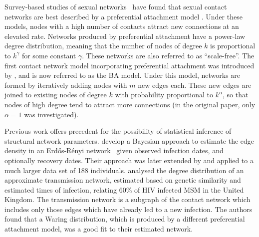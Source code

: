 \documentclass[12pt]{article}\usepackage[]{graphicx}\usepackage[]{color}
\begin{document}
Survey-based studies of sexual networks~\autocite{liljeros2001web,
schneeberger2004scale} have found that sexual contact networks are best
described by a preferential attachment model \autocite[although there has been
some disagreement, see][]{jones2003assessment}. Under these models, nodes with
a high number of contacts attract new connections at an elevated rate. Networks
produced by preferential attachment have a power-law degree distribution,
meaning that the number of nodes of degree $k$ is proportional to $k^\gamma$
for some constant $\gamma$. These networks are also referred to as
``scale-free''. The first contact network model incorporating preferential
attachment was introduced by \textcite{barabasi1999emergence}, and is now
referred to as the \gls{BA} model. Under this model, networks are formed by
iteratively adding nodes with $m$ new edges each. These new edges are joined to
existing nodes of degree $k$ with probability proportional to $k^\alpha$, so
that nodes of high degree tend to attract more connections (in the original
paper, only $\alpha = 1$ was investigated).

Previous work offers precedent for the possibility of statistical inference of
structural network parameters. \textcite{britton2002bayesian} develop a
Bayesian approach to estimate the edge density in an Erd\H{o}s-R\'enyi
network~\autocite{erdos1960evolution} given observed infection dates, and
optionally recovery dates. Their approach was later extended by
\textcite{groendyke2011bayesian} and applied to a much larger data set of 188
individuals. \textcite{brown2011transmission} analysed the degree distribution
of an approximate transmission network, estimated based on genetic similarity
and estimated times of infection, relating 60\% of HIV infected \gls{MSM} in
the United Kingdom. The transmission network is a subgraph of the contact
network which includes only those edges which have already led to a new
infection. The authors found that a Waring distribution, which is produced by a
different preferential attachment model, was a good fit to their estimated
network.
\end{document}
